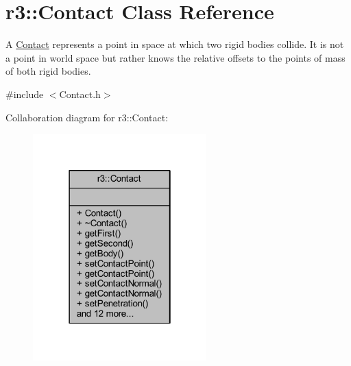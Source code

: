 \hypertarget{classr3_1_1_contact}{}\section{r3\+:\+:Contact Class Reference}
\label{classr3_1_1_contact}


A \mbox{\hyperlink{classr3_1_1_contact}{Contact}} represents a point in space at which two rigid bodies collide. It is not a point in world space but rather knows the relative offsets to the points of mass of both rigid bodies.  




{\ttfamily \#include $<$Contact.\+h$>$}



Collaboration diagram for r3\+:\+:Contact\+:\nopagebreak
\begin{figure}[H]
\begin{center}
\leavevmode
\includegraphics[width=190pt]{classr3_1_1_contact__coll__graph}
\end{center}
\end{figure}
